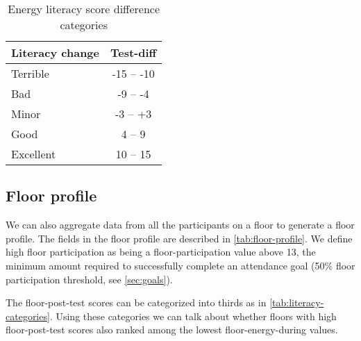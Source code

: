 \begin{table}[htbp]
	\centering
		\begin{tabular}{| l | c |}
			\hline
			Literacy change & Test-diff \\ \hline
				
			Terrible & -15 -- -10 \\ \hline

			Bad & -9 -- -4 \\ \hline

			Minor & -3 -- +3 \\ \hline

			Good & 4 -- 9 \\ \hline

			Excellent & 10 -- 15 \\ \hline

		\end{tabular}
	\caption{Energy literacy score difference categories}
	\label{tab:literacy-diff}
\end{table}

\subsection{Floor profile}
\label{sec:floor-profile}

We can also aggregate data from all the participants on a floor to generate a floor profile. The fields in the floor profile are described in \autoref{tab:floor-profile}. We define high floor participation as being a floor-participation value above 13, the minimum amount required to successfully complete an attendance goal (50\% floor participation threshold, see \autoref{sec:goals}).

The floor-post-test scores can be categorized into thirds as in \autoref{tab:literacy-categories}. Using these categories we can talk about whether floors with high floor-post-test scores also ranked among the lowest floor-energy-during values.

